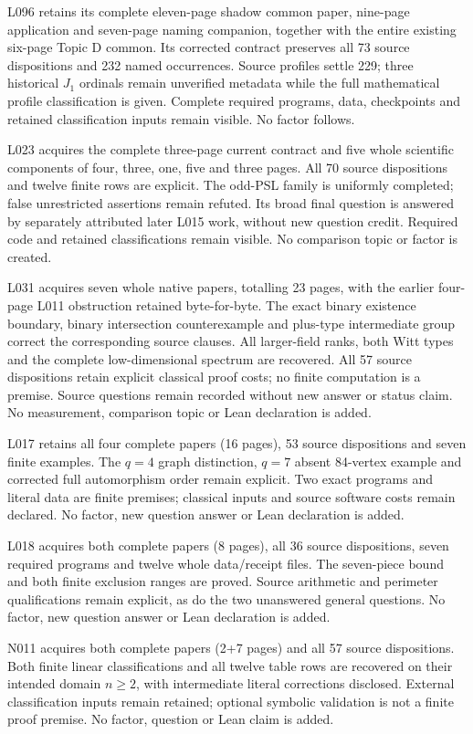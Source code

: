 \documentclass[11pt,a4paper]{article}
\begin{document}
L096 retains its complete eleven-page shadow common paper, nine-page
application and seven-page naming companion, together with the entire existing
six-page Topic D common. Its corrected contract preserves all 73 source
dispositions and 232 named occurrences. Source profiles settle 229; three
historical $J_1$ ordinals remain unverified metadata while the full mathematical
profile classification is given. Complete required programs, data, checkpoints
and retained classification inputs remain visible. No factor follows.

L023 acquires the complete three-page current contract and five whole
scientific components of four, three, one, five and three pages. All 70
source dispositions and twelve finite rows are explicit. The odd-PSL family
is uniformly completed; false unrestricted assertions remain refuted.
Its broad final question is answered by separately attributed later L015
work, without new question credit. Required code and retained classifications
remain visible. No comparison topic or factor is created.

L031 acquires seven whole native papers, totalling 23 pages, with the earlier
four-page L011 obstruction retained byte-for-byte. The exact binary existence
boundary, binary intersection counterexample and plus-type intermediate group
correct the corresponding source clauses. All larger-field ranks, both Witt
types and the complete low-dimensional spectrum are recovered. All 57 source
dispositions retain explicit classical proof costs; no finite computation is
a premise. Source questions remain recorded without new answer or status claim.
No measurement, comparison topic or Lean declaration is added.

L017 retains all four complete papers (16 pages), 53 source dispositions and
seven finite examples. The $q=4$ graph distinction, $q=7$ absent 84-vertex example
and corrected full automorphism order remain explicit. Two exact programs and
literal data are finite premises; classical inputs and source software costs
remain declared. No factor, new question answer or Lean declaration is added.

L018 acquires both complete papers (8 pages), all 36 source dispositions,
seven required programs and twelve whole data/receipt files. The seven-piece
bound and both finite exclusion ranges are proved. Source arithmetic and
perimeter qualifications remain explicit, as do the two unanswered general
questions. No factor, new question answer or Lean declaration is added.

N011 acquires both complete papers (2+7 pages) and all 57 source dispositions.
Both finite linear classifications and all twelve table rows are recovered on
their intended domain  $n\geq2$, with intermediate literal corrections disclosed.
External classification inputs remain retained; optional symbolic validation
is not a finite proof premise. No factor, question or Lean claim is added.
\end{document}
